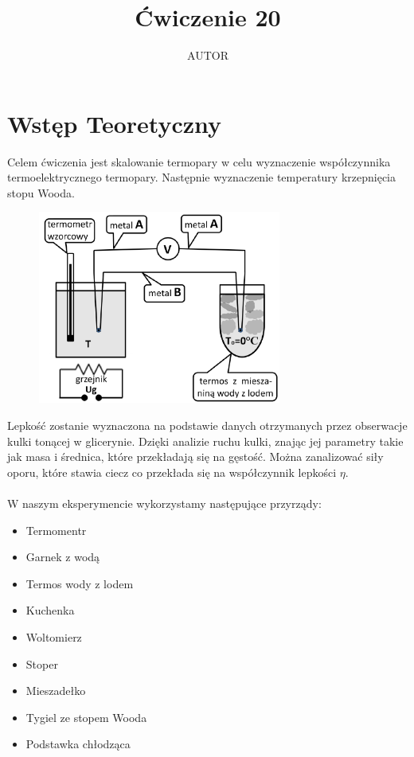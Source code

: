 \documentclass{article}
\title{Ćwiczenie 20}
\author{AUTOR}
\date{}
\begin{document}
\maketitle
\section{Wstęp Teoretyczny}
Celem ćwiczenia jest skalowanie termopary w celu wyznaczenie współczynnika termoelektrycznego termopary. Następnie wyznaczenie temperatury krzepnięcia stopu Wooda.\\
\begin{figure}[h]
    \centering
    \includegraphics[width=8cm]{schemat_ukladu.png}
\end{figure}
Lepkość zostanie wyznaczona na podstawie danych otrzymanych przez obserwacje kulki 
tonącej w glicerynie. Dzięki analizie ruchu kulki, znając jej parametry takie 
jak masa i średnica, które przekładają się na gęstość. Można zanalizować siły oporu,
które stawia ciecz co przekłada się na współczynnik lepkości $\eta$.\\ \\
W naszym eksperymencie wykorzystamy następujące przyrządy:\\
\begin{itemize}
    \item Termomentr
    \item Garnek z wodą
    \item Termos wody z lodem
    \item Kuchenka
    \item Woltomierz
    \item Stoper
    \item Mieszadełko
    \item Tygiel ze stopem Wooda
    \item Podstawka chłodząca
\end{itemize}
\end{document}
